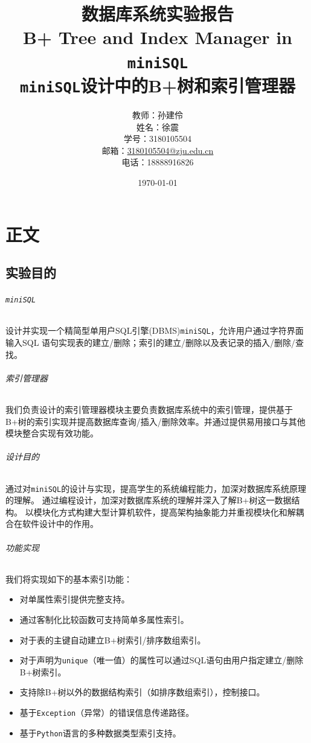 \documentclass[UTF8]{ctexrep} %
\title{数据库系统实验报告\\
  B+ Tree and Index Manager in \texttt{miniSQL} \\
  \large \texttt{miniSQL}设计中的B+树和索引管理器}
\author{
教师：孙建伶\\
姓名：徐震\\
学号：3180105504\\
邮箱：\href{3180105504@zju.edu.cn}{3180105504@zju.edu.cn}\\
电话：18888916826
}
\date{\today}
\begin{document}
\maketitle
\newpage
\tableofcontents
\newpage
\part{正文}
\chapter{实验目的}
\paragraph{\texttt{miniSQL}}
设计并实现一个精简型单用户SQL引擎(DBMS)\texttt{miniSQL}，允许用户通过字符界面输入SQL 语句实现表的建立/删除；索引的建立/删除以及表记录的插入/删除/查找。
\paragraph{索引管理器}
我们负责设计的索引管理器模块主要负责数据库系统中的索引管理，提供基于B+树的索引实现并提高数据库查询/插入/删除效率。并通过提供易用接口与其他模块整合实现有效功能。
\paragraph{设计目的}
通过对\texttt{miniSQL}的设计与实现，提高学生的系统编程能力，加深对数据库系统原理的理解。
通过编程设计，加深对数据库系统的理解并深入了解B+树这一数据结构。
以模块化方式构建大型计算机软件，提高架构抽象能力并重视模块化和解耦合在软件设计中的作用。
\paragraph{功能实现}
我们将实现如下的基本索引功能：
\begin{itemize}
    \item 对单属性索引提供完整支持。
    \item 通过客制化比较函数可支持简单多属性索引。
    \item 对于表的主键自动建立B+树索引/排序数组索引。
    \item 对于声明为\texttt{unique}（唯一值）的属性可以通过SQL语句由用户指定建立/删除B+树索引。
    \item 支持除B+树以外的数据结构索引（如排序数组索引），控制接口。
    \item 基于\texttt{Exception}（异常）的错误信息传递路径。
    \item 基于\texttt{Python}语言的多种数据类型索引支持。
\end{itemize}
\end{document}
